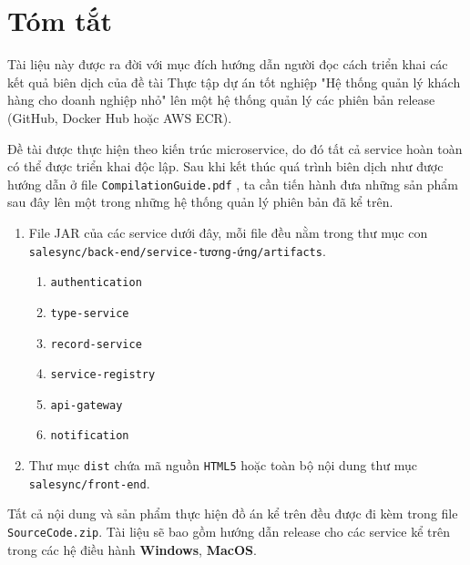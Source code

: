 \chapter*{Tóm tắt}
\label{summary}
Tài liệu này được ra đời với mục đích hướng dẫn người đọc cách triển khai các kết quả biên dịch của đề tài Thực tập dự án tốt nghiệp "Hệ thống quản lý khách hàng cho doanh nghiệp nhỏ" lên một hệ thống quản lý các phiên bản release (GitHub, Docker Hub hoặc AWS ECR).

Đề tài được thực hiện theo kiến trúc microservice, do đó tất cả service hoàn toàn có thể được triển khai độc lập. Sau khi kết thúc quá trình biên dịch như được hướng dẫn ở file \texttt{CompilationGuide.pdf} , ta cần tiến hành đưa những sản phẩm sau đây lên một trong những hệ thống quản lý phiên bản đã kể trên.
\begin{enumerate}
    \item File JAR của các service dưới đây, mỗi file đều nằm trong thư mục con \texttt{salesync/back-end/service-tương-ứng/artifacts}.
    \begin{enumerate}
        \item \texttt{authentication}
        \item \texttt{type-service}
        \item \texttt{record-service}
        \item \texttt{service-registry}
        \item \texttt{api-gateway}
        \item \texttt{notification}
    \end{enumerate}
    \item Thư mục \texttt{dist} chứa mã nguồn \texttt{HTML5} hoặc toàn bộ nội dung thư mục \texttt{salesync/front-end}.
\end{enumerate}

Tất cả nội dung và sản phẩm thực hiện đồ án kể trên đều được đi kèm trong file \texttt{SourceCode.zip}. Tài liệu sẽ bao gồm hướng dẫn release cho các service kể trên trong các hệ điều hành \textbf{Windows}, \textbf{MacOS}.